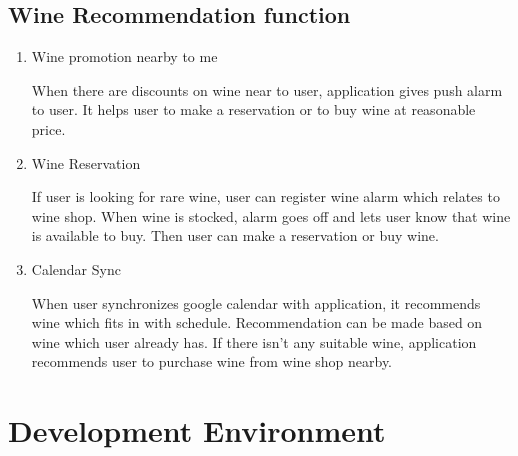 \documentclass[conference]{IEEEtran}
\numberwithin{figure}{subsection}
\begin{document}
\subsection {\textbf{Wine Recommendation function}}

\begin{enumerate}
\item Wine promotion nearby to me 


When there are discounts on wine near to user, application gives push alarm to user. It helps user to make a reservation or to buy wine at reasonable price.
\item Wine Reservation


If user is looking for rare wine, user can register wine alarm which relates to wine shop. When wine is stocked, alarm goes off and lets user know that wine is available to buy. Then user can make a reservation or buy wine.
\item Calendar Sync


When user synchronizes google calendar with application, it recommends wine which fits in with schedule. Recommendation can be made based on wine which user already has. If there isn't any suitable wine, application recommends user to purchase wine from wine shop nearby.
\end{enumerate}

\section{Development Environment}
\end{document}
